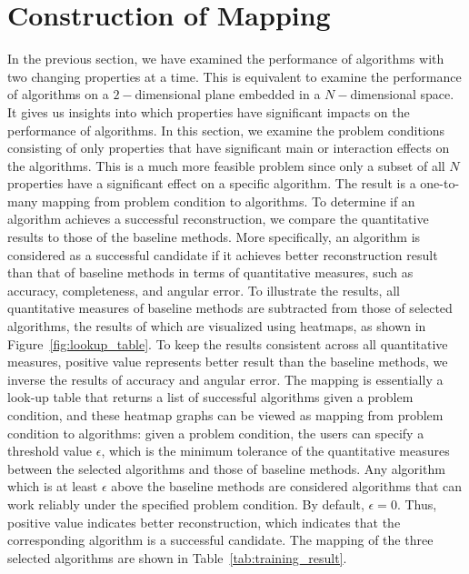 \section{Construction of Mapping}
\label{sec:lookup_table}
In the previous section, we have examined the performance of algorithms with two changing properties at a time. This is equivalent to examine the performance of algorithms on a $2-$dimensional plane embedded in a $N-$dimensional space. It gives us insights into which properties have significant impacts on the performance of algorithms. In this section, we examine the problem conditions consisting of only properties that have significant main or interaction effects on the algorithms. This is a much more feasible problem since only a subset of all $N$ properties have a significant effect on a specific algorithm. The result is a one-to-many mapping from problem condition to algorithms. To determine if an algorithm achieves a successful reconstruction, we compare the quantitative results to those of the baseline methods. More specifically, an algorithm is considered as a successful candidate if it achieves better reconstruction result than that of baseline methods in terms of quantitative measures, such as accuracy, completeness, and angular error. To illustrate the results, all quantitative measures of baseline methods are subtracted from those of selected algorithms, the results of which are visualized using heatmaps, as shown in Figure~\ref{fig:lookup_table}. To keep the results consistent across all quantitative measures, \ie positive value represents better result than the baseline methods, we inverse the results of accuracy and angular error. The mapping is essentially a look-up table that returns a list of successful algorithms given a problem condition, and these heatmap graphs can be viewed as mapping from problem condition to algorithms: given a problem condition, the users can specify a threshold value $\epsilon$, which is the minimum tolerance of the quantitative measures between the selected algorithms and those of baseline methods. Any algorithm which is at least $\epsilon$ above the baseline methods are considered algorithms that can work reliably under the specified problem condition. By default, $\epsilon = 0$. Thus, positive value indicates better reconstruction, which indicates that the corresponding algorithm is a successful candidate. The mapping of the three selected algorithms are shown in Table~\ref{tab:training_result}.
